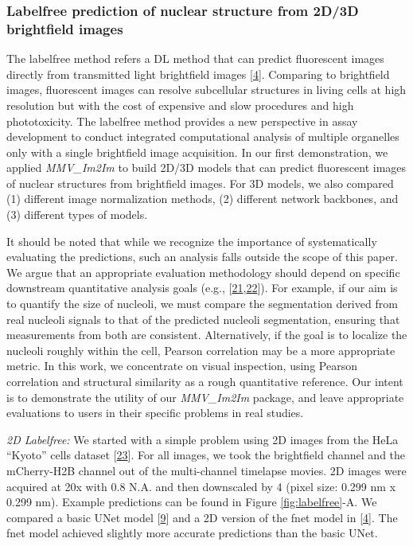 \hypertarget{labelfree-prediction-of-nuclear-structure-from-2d3d-brightfield-images}{%
\subsubsection{Labelfree prediction of nuclear structure from 2D/3D brightfield images}\label{labelfree-prediction-of-nuclear-structure-from-2d3d-brightfield-images}}

The labelfree method refers a DL method that can predict fluorescent images directly from transmitted light brightfield images {[}\protect\hyperlink{ref-Yq8wZ6hc}{4}{]}. Comparing to brightfield images, fluorescent images can resolve subcellular structures in living cells at high resolution but with the cost of expensive and slow procedures and high phototoxicity. The labelfree method provides a new perspective in assay development to conduct integrated computational analysis of multiple organelles only with a single brightfield image acquisition. In our first demonstration, we applied \emph{MMV\_Im2Im} to build 2D/3D models that can predict fluorescent images of nuclear structures from brightfield images. For 3D models, we also compared (1) different image normalization methods, (2) different network backbones, and (3) different types of models.

It should be noted that while we recognize the importance of systematically evaluating the predictions, such an analysis falls outside the scope of this paper. We argue that an appropriate evaluation methodology should depend on specific downstream quantitative analysis goals (e.g., {[}\protect\hyperlink{ref-gPpwGUco}{21},\protect\hyperlink{ref-EOO2mf0p}{22}{]}). For example, if our aim is to quantify the size of nucleoli, we must compare the segmentation derived from real nucleoli signals to that of the predicted nucleoli segmentation, ensuring that measurements from both are consistent. Alternatively, if the goal is to localize the nucleoli roughly within the cell, Pearson correlation may be a more appropriate metric. In this work, we concentrate on visual inspection, using Pearson correlation and structural similarity as a rough quantitative reference. Our intent is to demonstrate the utility of our \emph{MMV\_Im2Im} package, and leave appropriate evaluations to users in their specific problems in real studies.

\emph{2D Labelfree:} We started with a simple problem using 2D images from the HeLa ``Kyoto'' cells dataset {[}\protect\hyperlink{ref-xv2VIyRP}{23}{]}. For all images, we took the brightfield channel and the mCherry-H2B channel out of the multi-channel timelapse movies. 2D images were acquired at 20x with 0.8 N.A. and then downscaled by 4 (pixel size: 0.299 nm x 0.299 nm). Example predictions can be found in Figure \ref{fig:labelfree}-A. We compared a basic UNet model {[}\protect\hyperlink{ref-TutLhFSz}{9}{]} and a 2D version of the fnet model in {[}\protect\hyperlink{ref-Yq8wZ6hc}{4}{]}. The fnet model achieved slightly more accurate predictions than the basic UNet.

